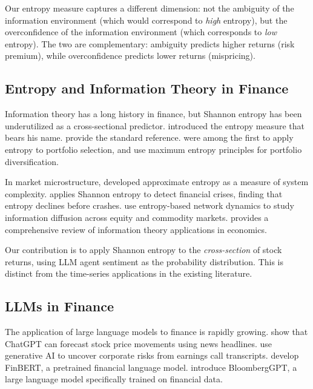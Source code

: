 \documentclass[12pt,a4paper]{article}
\begin{document}
Our entropy measure captures a different dimension: not the ambiguity of the information environment (which would correspond to \textit{high} entropy), but the overconfidence of the information environment (which corresponds to \textit{low} entropy). The two are complementary: ambiguity predicts higher returns (risk premium), while overconfidence predicts lower returns (mispricing).

\subsection{Entropy and Information Theory in Finance}

Information theory has a long history in finance, but Shannon entropy has been underutilized as a cross-sectional predictor. \citet{Shannon1948} introduced the entropy measure that bears his name. \citet{CoverThomas2006} provide the standard reference. \citet{PhilippatosWilson1972} were among the first to apply entropy to portfolio selection, and \citet{BeraPark2008} use maximum entropy principles for portfolio diversification.

In market microstructure, \citet{Pincus1991} developed approximate entropy as a measure of system complexity. \citet{Risso2009} applies Shannon entropy to detect financial crises, finding that entropy declines before crashes. \citet{Bekiros2015} use entropy-based network dynamics to study information diffusion across equity and commodity markets. \citet{Maasoumi1993} provides a comprehensive review of information theory applications in economics.

Our contribution is to apply Shannon entropy to the \textit{cross-section} of stock returns, using LLM agent sentiment as the probability distribution. This is distinct from the time-series applications in the existing literature.

\subsection{LLMs in Finance}

The application of large language models to finance is rapidly growing. \citet{LopezTang2023} show that ChatGPT can forecast stock price movements using news headlines. \citet{Kim2024} use generative AI to uncover corporate risks from earnings call transcripts. \citet{Yang2020} develop FinBERT, a pretrained financial language model. \citet{Wu2023} introduce BloombergGPT, a large language model specifically trained on financial data.
\end{document}
